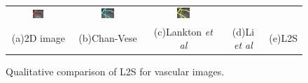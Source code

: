 \begin{figure}[t]
\begin{tabular}{@{}ccccc@{}}
\includegraphics[width=0.19\textwidth]{images/L2S_compare_region/vessel1_Lankton} &
\includegraphics[width=0.19\textwidth]{images/L2S_compare_region/vessel1_Li}	&
\includegraphics[width=0.19\textwidth]{images/L2S_compare_region/vessel1_ours}	
\\
\scriptsize(a)2D image&\scriptsize(b)Chan-Vese&\scriptsize(c)Lankton \textit{et al}\cite{lankton_localCV}&\scriptsize(d)Li \textit{et al}\cite{li_region_scalable}&\scriptsize(e)L2S
\end{tabular}
\caption[L2S on vascular images]{Qualitative comparison of L2S for vascular images.}
\label{fig:l2s_compare_vessels}
\end{figure}
\clearpage

